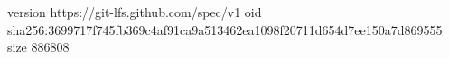 version https://git-lfs.github.com/spec/v1
oid sha256:3699717f745fb369c4af91ca9a513462ea1098f20711d654d7ee150a7d869555
size 886808
